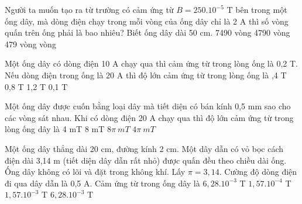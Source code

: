 \begin{vidu} %
Người ta muốn tạo ra từ trường có cảm ứng từ $B = 250.10^{-5}$ T bên trong một ống dây, mà dòng điện chạy trong mỗi vòng của ống dây chỉ là 2 A thì số vòng quấn trên ống phải là bao nhiêu? Biết ống dây dài 50 cm.
\choice
{7490 vòng}
{4790 vòng}
{479 vòng}
{ vòng}
\end{vidu}
\begin{vidu} %
Một ống dây có dòng điện 10 A chạy qua thì cảm ứng từ trong lòng ống là 0,2 T. Nếu dòng điện trong ống là 20 A thì độ lớn cảm ứng từ trong lòng ống là
\choice
{,4 T}
{0,8 T}
{1,2 T}
{0,1 T}
\end{vidu}
\begin{vidu} %
Một ống dây được cuốn bằng loại dây mà tiết diện có bán kính 0,5 mm sao cho các vòng sát nhau. Khi có dòng điện 20 A chạy qua thì độ lớn cảm ứng từ trong lòng ống dây là
\choice
{4 mT}
{8 mT}
{\True $8\pi\ mT$}
{$4\pi\ mT$}
\end{vidu}
\begin{vidu} %
Một ống dây thẳng dài 20 cm, đường kính 2 cm. Một dây dẫn có vỏ bọc cách điện dài 3,14 m (tiết diện dây dẫn rất nhỏ) được quấn đều theo chiều dài ống. Ống dây không có lõi và đặt trong không khí. Lấy $\pi = 3,14$. Cường độ dòng điện đi qua dây dẫn là 0,5 A. Cảm ứng từ trong ống dây là
\choice
{$6,28.10^{-3}$ T}
{\True $1,57.10^{-4}$ T}
{$1,57.10^{-3}$ T}
{$6,28.10^{-3}$ T}
\end{vidu}
